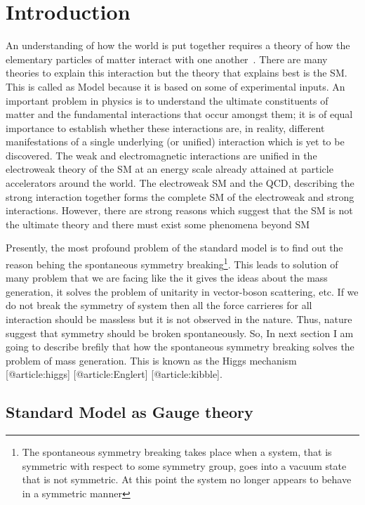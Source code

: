 \chapter{Introduction}

An understanding of how the world is put together requires a theory of how the elementary particles of matter interact with one another~\cite{Hooft1980}. There are many theories to explain this interaction but the theory that explains best is the SM. This is called as Model because it is based on some of experimental inputs. An important problem in physics is to understand the ultimate constituents of matter and the fundamental interactions that occur amongst them; it is of equal importance to establish whether these interactions are, in reality, different manifestations of a single underlying (or unified) interaction which is yet to be discovered. The weak and electromagnetic interactions are unified in the electroweak theory of the SM at an energy scale already attained at particle accelerators around the world. The electroweak SM and the QCD, describing the strong interaction together forms the complete SM of the electroweak and strong interactions. However, there are strong reasons which suggest that the SM is not the ultimate theory and there must exist some phenomena beyond SM \cite{Quigg1985,article:PAdventure}

Presently, the most profound problem of the standard model is to find out the reason behing the spontaneous symmetry breaking\footnote{The spontaneous symmetry breaking takes place when a system, that is symmetric with respect to some symmetry group, goes into a vacuum state that is not symmetric. At this point the system no longer appears to behave in a symmetric manner}. This leads to solution of many problem that we are facing like the it gives the ideas about the mass generation, it solves the problem of unitarity in vector-boson scattering, etc. If we do not break the symmetry of system then all the force carrieres for all interaction should be massless but it is not observed in the nature. Thus, nature suggest that symmetry should be broken spontaneously. So, In next section I am going to describe brefily that how the spontaneous symmetry breaking solves the problem of mass generation. This is known as the Higgs mechanism [@article:higgs] [@article:Englert] [@article:kibble].

\section{Standard Model as Gauge theory}

